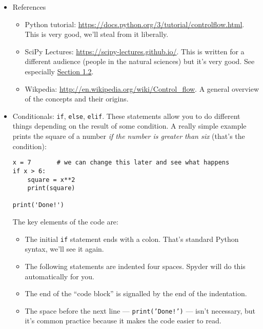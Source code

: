 \documentclass[11pt]{article}
\begin{document}
%
\begin{itemize}
\item References
\begin{itemize}
\item Python tutorial:  \url{https://docs.python.org/3/tutorial/controlflow.html}.
This is very good, we'll steal from it liberally.

\item SciPy Lectures:  \url{https://scipy-lectures.github.io/}.
This is written for a different audience (people in the natural sciences)
but it's very good.
See especially \href{https://scipy-lectures.github.io/intro/language/python_language.html}{Section 1.2}.

\item Wikpedia:  \url{http://en.wikipedia.org/wiki/Control_flow}.
A general overview of the concepts and their origins.
\end{itemize}

\begin{comment}

Separate sections for conditionals and loops

Overview.  Have picture for conditional statement:  if (condition) is True, do one thing, if false
do another

Conditions (Boolean expressions).
5 == 6
5==5
'Dave' > 'Glenn'

Compound conditions. ??

Loops
i = 0.1
Use a loop over n to determine how many periods it takes to double your money.
That is, find the first n for which (1+i)**n > 2.

Check Comm 64, Coursera, etc for examples

\end{comment}


\item Conditionals: {\tt if}, {\tt else}, {\tt elif}.
These statements allow you to do different things depending
on the result of some condition.  A really simple example
prints the square of a number {\it if the number is greater than six\/}
(that's the condition):
%
\begin{verbatim}
x = 7       # we can change this later and see what happens
if x > 6:
    square = x**2
    print(square)

print('Done!')
\end{verbatim}
%
The key elements of the code are:
\begin{itemize}
\item The initial {\tt if} statement ends with a colon.
That's standard Python syntax, we'll see it again.
\item The following statements are indented four spaces.
Spyder will do this automatically for you.
\item The end of the ``code block'' is signalled by the end of the indentation.
\item The space before the next line --- {\tt print('Done!')} --- isn't necessary,
but it's common practice because it makes the code easier to read.
\end{itemize}


\end{itemize}
\end{document}
